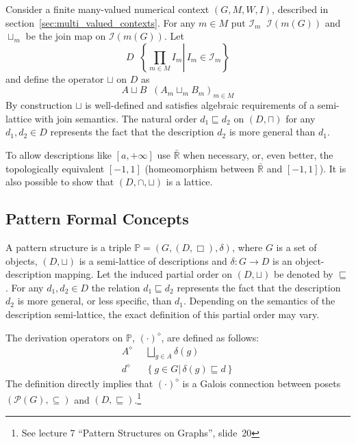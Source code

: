 \documentclass[a4paper]{article}
\newcommand{\obj}[1]{{\left\{ #1 \right \}}}
\newcommand{\clo}[1]{{\left [ #1 \right ]}}
\newcommand{\brac}[1]{{\left ( #1 \right )}}
\newcommand{\induc}[1]{{\left . #1 \right \vert}}
\newcommand{\Real}{\mathbb{R}}
\newcommand{\Pwr}{\mathcal{P}}
\newcommand{\Ical}{\mathcal{I}}
\newcommand{\Pat}{\mathbb{P}}
\newcommand{\defn}{\mathop{\overset{\Delta}{=}}\nolimits}
\begin{document}
Consider a finite many-valued numerical context $\brac{G,M,W,I}$, described in section~\ref{sec:multi_valued_contexts}. For any $m\in M$ put $\Ical_m \defn \Ical\brac{m(G)}$ and $\sqcup_m$ be the join map on $\Ical\brac{m(G)}$. Let \[D\defn \obj{\induc{\prod_{m\in M} I_m}\, I_m\in \mathcal{I}_m}\] and define the operator $\sqcup$ on $D$ as \[ A\sqcup B \defn \brac{A_m\sqcup_m B_m}_{m\in M}\] By construction $\sqcup$ is well-defined and satisfies algebraic requirements of a semi-lattice with join semantics. The natural order $d_1\sqsubseteq d_2$ on $(D,\sqcap)$ for any $d_1, d_2\in D$ represents the fact that the description $d_2$ is more general than $d_1$.

To allow descriptions like $\clo{a, +\infty}$ use $\bar{\Real}$ when necessary, or, even better, the topologically equivalent $\clo{-1,1}$ (homeomorphism between $\bar{\Real}$ and $\clo{-1,1}$). It is also possible to show that $(D,\cap,\sqcup)$ is a lattice.


\subsection{Pattern Formal Concepts} %
\label{sub:pattern_formal_concepts}

A pattern structure is a triple $\Pat=\brac{G,(D,\Box), \delta}$, where $G$ is a set of objects, $(D,\sqcup)$ is a semi-lattice of descriptions and $\delta: G\to D$ is an object-description mapping. Let the induced partial order on $(D,\sqcup)$ be denoted by $\sqsubseteq$. For any $d_1, d_2\in D$ the relation $d_1\sqsubseteq d_2$ represents the fact that the description $d_2$ is more general, or less specific, than $d_1$. Depending on the semantics of the description semi-lattice, the exact definition of this partial order may vary.

The derivation operators on $\Pat$, ${(\cdot)}^\diamond$, are defined as follows: \begin{align*}
	A^\diamond &\defn \bigsqcup_{g\in A} \delta(g)\\
	d^\diamond &\defn \obj{\induc{g\in G}\,\delta(g) \sqsubseteq d}
\end{align*}
The definition directly implies that ${(\cdot)}^\diamond$ is a Galois connection between posets $\brac{\Pwr(G),\subseteq}$ and $(D,\sqsubseteq)$.\footnote{See lecture 7 ``Pattern Structures on Graphs'', slide~20}
\end{document}
